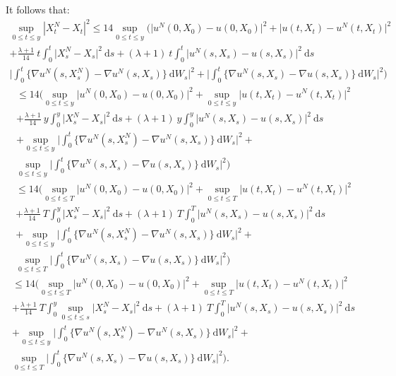 \documentclass{article}[12pt]
\newcommand{\di}{\mathrm{d}}
\begin{document}
        It follows that:
        \begin{multline*}
        \underset{0\leq t\leq y}{\sup}\left|X^{N}_t-X_t\right|^2\leq 14\underset{0\leq t\leq y}{\sup}\Bigg(\Big|u^N(0,X_0) - u(0,X_0)\Big|^2 + \Big|u(t,X_t) - u^N(t,X_t)\Big|^2 \\ + \frac{\lambda+1}{14}\ t\int_0^t \big|X_s^N- X_s\big|^2\ \di s + (\lambda+1)\ t\int_0^t \big|u^N(s,X_s) - u(s,X_s)\big|^2\ \di s \\\bigg|\int_0^t \{\nabla u^N(s,X_s^N) - \nabla u^N(s,X_s)\}\ \di W_s\bigg|^2 + \bigg|\int_0^t \{\nabla u^N(s,X_s) - \nabla u(s,X_s)\}\ \di W_s\bigg|^2 \Bigg)
        \end{multline*}
        \begin{multline*}
        \leq 14\Bigg(\underset{0\leq t\leq y}{\sup}\Big|u^N(0,X_0) - u(0,X_0)\Big|^2 + \underset{0\leq t\leq y}{\sup}\Big|u(t,X_t) - u^N(t,X_t)\Big|^2 \\ + \frac{\lambda+1}{14}\ y\int_0^y \big|X_s^N- X_s\big|^2\ \di s + (\lambda+1)\ y\int_0^y \big|u^N(s,X_s) - u(s,X_s)\big|^2\ \di s \\+ \underset{0\leq t\leq y}{\sup}\bigg|\int_0^t \{\nabla u^N(s,X_s^N) - \nabla u^N(s,X_s)\}\ \di W_s\bigg|^2 +\\ \underset{0\leq t\leq y}{\sup} \bigg|\int_0^t \{\nabla u^N(s,X_s) - \nabla u(s,X_s)\}\ \di W_s\bigg|^2 \Bigg)
        \end{multline*}
        \begin{multline*}
        \leq 14\Bigg(\underset{0\leq t\leq T}{\sup}\Big|u^N(0,X_0) - u(0,X_0)\Big|^2 + \underset{0\leq t\leq T}{\sup}\Big|u(t,X_t) - u^N(t,X_t)\Big|^2 \\ + \frac{\lambda+1}{14}\ T\int_0^y \big|X_s^N- X_s\big|^2\ \di s + (\lambda+1)\ T\int_0^T \big|u^N(s,X_s) - u(s,X_s)\big|^2\ \di s \\+ \underset{0\leq t\leq y}{\sup}\bigg|\int_0^t \{\nabla u^N(s,X_s^N) - \nabla u^N(s,X_s)\}\ \di W_s\bigg|^2 +\\ \underset{0\leq t\leq T}{\sup} \bigg|\int_0^t \{\nabla u^N(s,X_s) - \nabla u(s,X_s)\}\ \di W_s\bigg|^2 \Bigg)
        \end{multline*}
        \begin{multline*}
        \leq 14\Bigg(\underset{0\leq t\leq T}{\sup}\Big|u^N(0,X_0) - u(0,X_0)\Big|^2 + \underset{0\leq t\leq T}{\sup}\Big|u(t,X_t) - u^N(t,X_t)\Big|^2 \\ + \frac{\lambda+1}{14}\ T\int_0^y \underset{0\leq t\leq s}{\sup}\big|X_s^N- X_s\big|^2\ \di s + (\lambda+1)\ T\int_0^T \big|u^N(s,X_s) - u(s,X_s)\big|^2\ \di s \\+\underset{0\leq t\leq y}{\sup}\bigg|\int_0^t \{\nabla u^N(s,X_s^N) - \nabla u^N(s,X_s)\}\ \di W_s\bigg|^2 +\\ \underset{0\leq t\leq T}{\sup} \bigg|\int_0^t \{\nabla u^N(s,X_s) - \nabla u(s,X_s)\}\ \di W_s\bigg|^2 \Bigg).
        \end{multline*}
\end{document}
